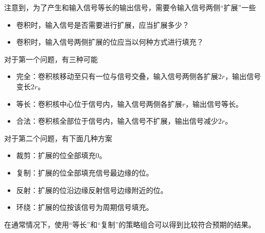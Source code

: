注意到，为了产生和输入信号等长的输出信号，需要令输入信号两侧“扩展”一些
\begin{itemize}
    \item 卷积时，输入信号是否需要进行扩展，应当扩展多少？
    \item 卷积时，输入信号两侧扩展的位应当以何种方式进行填充？
\end{itemize}
对于第一个问题，有三种可能
\begin{itemize}
    \item 完全：卷积核移动至只有一位与信号交叠，输入信号两侧各扩展$2r$，输出信号变长$2r$。
    \item 等长：卷积核中心位于信号内，输入信号两侧各扩展$r$，输出信号等长。
    \item 合法：卷积核全部位于信号内，输入信号不扩展，输出信号减少$2r$。
\end{itemize}
对于第二个问题，有下面几种方案
\begin{itemize}
    \item 裁剪：扩展的位全部填充$0$。
    \item 复制：扩展的位全部填充信号最边缘的位。
    \item 反射：扩展的位沿边缘反射信号边缘附近的位。
    \item 环绕：扩展的位按该信号为周期信号填充。
\end{itemize}
在通常情况下，使用“等长”和“复制”的策略组合可以得到比较符合预期的结果。